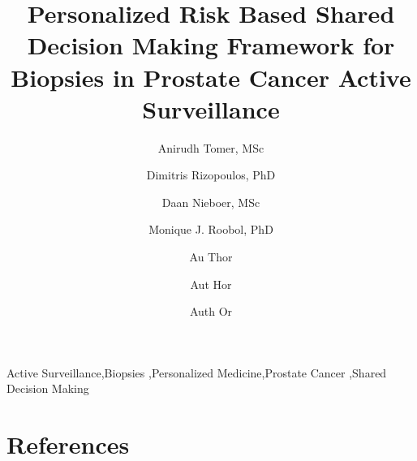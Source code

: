 \documentclass[review, 12pt]{elsarticle}
\begin{document}
\begin{frontmatter}

\title{Personalized Risk Based Shared Decision Making Framework for Biopsies in Prostate Cancer Active Surveillance}

\author[1]{Anirudh Tomer, MSc} 

\author[1]{Dimitris Rizopoulos, PhD}

\author[2]{Daan Nieboer, MSc}

\author[3]{Monique J. Roobol, PhD}

\author[4]{Au Thor}
\author[4]{Aut Hor}
\author[4]{Auth Or}

\address[1]{Department of Biostatistics, Erasmus University Medical Center, Rotterdam, the Netherlands}
\address[2]{Department of Public Health, Erasmus University Medical Center, Rotterdam, the Netherlands}
\address[3]{Department of Urology, Erasmus University Medical Center, Rotterdam, the Netherlands}
\address[4]{Department of xxxx, xxxx University Medical Center, City, Country}




\begin{keyword}
Active Surveillance\sep Biopsies \sep Personalized Medicine\sep Prostate Cancer \sep Shared Decision Making
\end{keyword}

\end{frontmatter}

\linenumbers







\section*{References}


\end{document}
